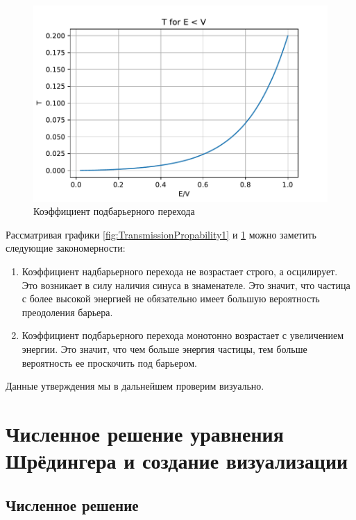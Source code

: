 \documentclass[a4paper, 12pt]{article}
\begin{document}
    \begin{figure}
        \centering
        \includegraphics{images/TransmissionPropability2.pdf}
        \caption{Коэффициент подбарьерного перехода}
        \label{fig:TransmissionPropability2}
    \end{figure}

    Рассматривая графики \ref{fig:TransmissionPropability1} и \ref{fig:TransmissionPropability2} можно заметить следующие
    закономерности:

    \begin{enumerate}
        \item Коэффициент надбарьерного перехода не возрастает строго, а осцилирует. Это возникает в силу наличия синуса в 
        знаменателе. Это значит, что частица с более высокой энергией не обязательно имеет большую вероятность преодоления 
        барьера.
        \item Коэффициент подбарьерного перехода монотонно возрастает с увеличением энергии. Это значит, что чем больше
        энергия частицы, тем больше вероятность ее проскочить под барьером.
    \end{enumerate}

    Данные утверждения мы в дальнейшем проверим визуально.
    
    \section{Численное решение уравнения Шрёдингера и создание визуализации}

    \subsection{Численное решение}
\end{document}
